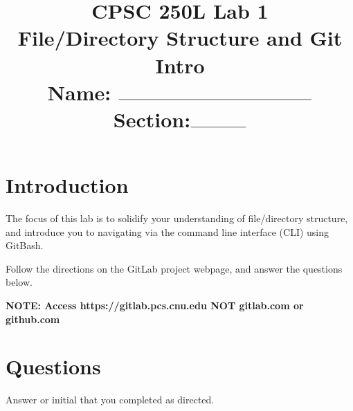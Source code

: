 \documentclass[notitlepage,12pt]{../../cpsc250l}
\title{CPSC 250L Lab 1\\[0.5em] File/Directory Structure and Git Intro\\[0.5em]Name: $\rule{7cm}{0.15mm}$  Section:$\rule{2cm}{0.15mm}$}
\begin{document}
\maketitle

\section{Introduction}

The focus of this lab is to solidify your understanding of file/directory structure, and
introduce you to navigating via the command line interface (CLI) using GitBash.

Follow the directions on the GitLab project webpage, and answer the questions below.

{\bf NOTE: Access https://gitlab.pcs.cnu.edu  NOT gitlab.com or github.com}

\section{Questions}

Answer or initial that you completed as directed.
\end{document}
